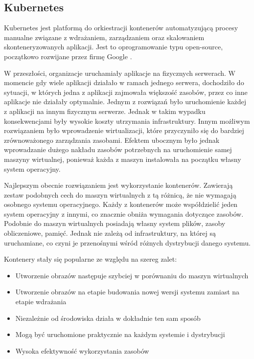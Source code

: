\subsection{Kubernetes}

Kubernetes jest platformą do orkiestracji kontenerów automatyzującą procesy manualne 
związane z wdrażaniem, zarządzaniem oraz skalowaniem skonteneryzowanych aplikacji. 
Jest to oprogramowanie typu open-source, początkowo rozwijane przez firmę Google
\cite{kubernetes2022}.

W przeszłości, organizacje uruchamiały aplikacje na fizycznych serwerach. W momencie 
gdy wiele aplikacji działało w ramach jednego serwera, dochodziło do 
sytuacji, w których jedna z aplikacji zajmowała większość zasobów, przez co inne 
aplikacje nie działały optymalnie. Jednym z rozwiązań było uruchomienie każdej 
z aplikacji na innym fizycznym serwerze. Jednak w takim wypadku konsekwencjami były 
wysokie koszty utrzymania infrastruktury. Innym możliwym rozwiązaniem było wprowadzenie 
wirtualizacji, które przyczyniło się do bardziej zrównoważonego zarządzania zasobami. 
Efektem ubocznym było jednak wprowadzanie dużego nakładu zasobów potrzebnych na 
uruchomienie samej maszyny wirtualnej, ponieważ każda z maszyn instalowała na początku 
własny system operacyjny.

Najlepszym obecnie rozwiązaniem jest wykorzystanie kontenerów. Zawierają zestaw 
podobnych cech do maszyn wirtualnych z tą różnicą, że nie wymagają osobnego systemu 
operacyjnego. Każdy z kontenerów może współdzielić jeden system operacyjny z 
innymi, co znacznie obniża wymagania dotyczące zasobów. Podobnie do maszyn 
wirtualnych posiadają własny system plików, zasoby obliczeniowe, pamięć. Jednak nie 
zależą od infrastruktury, na której są uruchamiane, co czyni je przenośnymi wśród 
różnych dystrybucji danego systemu.

Kontenery stały się popularne ze względu na szereg zalet:

\begin{itemize} %
    \item Utworzenie obrazów następuje szybciej w porównaniu do maszyn wirtualnych
    \item Utworzenie obrazów na etapie budowania nowej wersji systemu zamiast na etapie wdrażania
    \item Niezależnie od środowiska działa w dokładnie ten sam sposób
    \item Mogą być uruchomione praktycznie na każdym systemie i dystrybucji
    \item Wysoka efektywność wykorzystania zasobów
\end{itemize}

